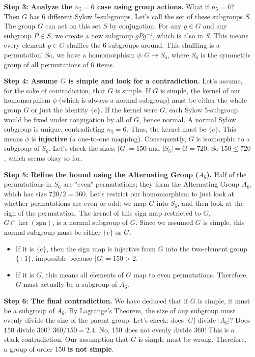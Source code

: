 \begin{solution}
\textbf{Step 3: Analyze the $n_5 = 6$ case using group actions.}
What if $n_5 = 6$? Then $G$ has 6 different Sylow 5-subgroups. Let's call the set of these subgroups $S$.
The group $G$ can act on this set $S$ by conjugation. For any $g \in G$ and any subgroup $P \in S$, we create a new subgroup $gPg^{-1}$, which is also in $S$.
This means every element $g \in G$ shuffles the 6 subgroups around. This shuffling is a permutation! So, we have a homomorphism $\phi: G \to S_6$, where $S_6$ is the symmetric group of all permutations of 6 items.

\textbf{Step 4: Assume $G$ is simple and look for a contradiction.}
Let's assume, for the sake of contradiction, that $G$ is simple.
If $G$ is simple, the kernel of our homomorphism $\phi$ (which is always a normal subgroup) must be either the whole group $G$ or just the identity $\{e\}$.
If the kernel were $G$, each Sylow 5-subgroup would be fixed under conjugation by all of $G$, hence normal. A normal Sylow subgroup is unique, contradicting $n_5=6$. Thus, the kernel must be $\{e\}$.
This means $\phi$ is \textbf{injective} (a one-to-one mapping). Consequently, $G$ is isomorphic to a subgroup of $S_6$.
Let's check the sizes: $|G| = 150$ and $|S_6| = 6! = 720$. So $150 \leq 720$, which seems okay so far.

\textbf{Step 5: Refine the bound using the Alternating Group ($A_6$).}
Half of the permutations in $S_6$ are "even" permutations; they form the Alternating Group $A_6$, which has size $720 / 2 = 360$.
Let's restrict our homomorphism to just look at whether permutations are even or odd: we map $G$ into $S_6$, and then look at the sign of the permutation. The kernel of this sign map restricted to $G$, $G \cap \ker(\text{sgn})$, is a normal subgroup of $G$.
Since we assumed $G$ is simple, this normal subgroup must be either $\{e\}$ or $G$.
\begin{itemize}
    \item If it is $\{e\}$, then the sign map is injective from $G$ into the two-element group $\{\pm1\}$, impossible because $|G|=150>2$.
    \item If it is $G$, this means all elements of $G$ map to even permutations. Therefore, $G$ must actually be a subgroup of $A_6$.
\end{itemize}

\textbf{Step 6: The final contradiction.}
We have deduced that if $G$ is simple, it must be a subgroup of $A_6$.
By Lagrange's Theorem, the size of any subgroup must evenly divide the size of the parent group.
Let's check: does $|G|$ divide $|A_6|$?
Does $150$ divide $360$?
$360 / 150 = 2.4$.
No, 150 does not evenly divide 360! This is a stark contradiction.
Our assumption that $G$ is simple must be wrong. Therefore, a group of order 150 \textbf{is not simple}.
\end{solution}

